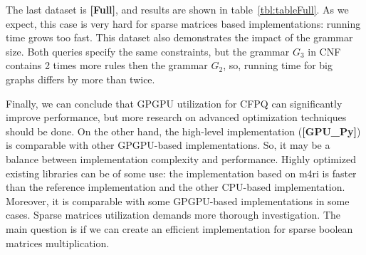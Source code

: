 The last dataset is \textbf{[Full]}, and results are shown in table~\ref{tbl:tableFull}.
As we expect, this case is very hard for sparse matrices based implementations: running time grows too fast.
This dataset also demonstrates the impact of the grammar size.
Both queries specify the same constraints, but the grammar $G_3$ in CNF contains 2 times more rules then the grammar $G_2$, so, running time for big graphs differs by more than twice.

Finally, we can conclude that GPGPU utilization for CFPQ can significantly improve performance, but more research on advanced optimization techniques should be done.
On the other hand, the high-level implementation (\textbf{[GPU\_Py]}) is comparable with other GPGPU-based implementations.
So, it may be a balance between implementation complexity and performance.
Highly optimized existing libraries can be of some use: the implementation based on m4ri is faster than the reference implementation and the other CPU-based implementation.
Moreover, it is comparable with some GPGPU-based implementations in some cases.
Sparse matrices utilization demands more thorough investigation.
The main question is if we can create an efficient implementation for sparse boolean matrices multiplication.
